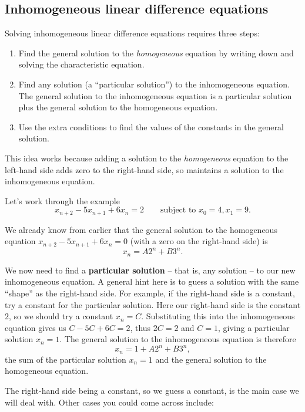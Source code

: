 \documentclass[
  a4paper,
]{article}
\providecommand{\tightlist}{%
  \setlength{\itemsep}{0pt}\setlength{\parskip}{0pt}}
\theoremstyle{definition}
\theoremstyle{definition}
\theoremstyle{definition}
\theoremstyle{remark}
\begin{document}
\hypertarget{inhom-ldes}{%
\subsection{Inhomogeneous linear difference equations}\label{inhom-ldes}}

Solving inhomogeneous linear difference equations requires three steps:

\begin{enumerate}
\def\labelenumi{\arabic{enumi}.}
\tightlist
\item
  Find the general solution to the \emph{homogeneous} equation by writing down and solving the characteristic equation.
\item
  Find any solution (a ``particular solution'') to the inhomogeneous equation. The general solution to the inhomogeneous equation is a particular solution plus the general solution to the homogeneous equation.
\item
  Use the extra conditions to find the values of the constants in the general solution.
\end{enumerate}

This idea works because adding a solution to the \emph{homogeneous} equation to the left-hand side adds zero to the right-hand side, so maintains a solution to the inhomogeneous equation.

Let's work through the example
\[ x_{n+2} - 5x_{n+1} + 6x_{n} = 2 \qquad \text{subject to } x_0 = 4, x_1 = 9 . \]

We already know from earlier that the general solution to the homogeneous equation \(x_{n+2} - 5x_{n+1} + 6x_{n} = 0\) (with a zero on the right-hand side) is
\[ x_n = A2^n + B3^n . \]

We now need to find a \textbf{particular solution} -- that is, any solution -- to our new inhomogeneous equation. A general hint here is to guess a solution with the same ``shape'' as the right-hand side. For example, if the right-hand side is a constant, try a constant for the particular solution. Here our right-hand side is the constant \(2\), so we should try a constant \(x_n = C\). Substituting this into the inhomogeneous equation gives us \(C - 5C + 6C = 2\), thus \(2C = 2\) and \(C = 1\), giving a particular solution \(x_n = 1\). The general solution to the inhomogeneous equation is therefore
\[ x_n = 1 + A2^n + B3^n , \]
the sum of the particular solution \(x_n = 1\) and the general solution to the homogeneous equation.

The right-hand side being a constant, so we guess a constant, is the main case we will deal with. Other cases you could come across include:
\end{document}
